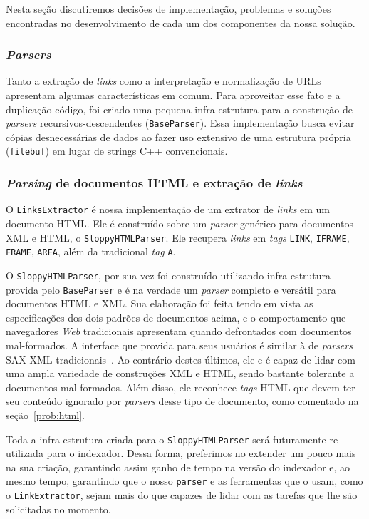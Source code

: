 \documentclass[10pt,twocolumn]{article}
\begin{document}
Nesta seção discutiremos decisões de implementação, problemas e soluções
encontradas no desenvolvimento de cada um dos componentes da nossa
solução.

\subsubsection{\emph{Parsers}}

Tanto a extração de \emph{links} como a interpretação e normalização de
URLs apresentam algumas características em comum. Para aproveitar esse
fato e a duplicação código, foi criado uma pequena infra-estrutura para
a construção de \emph{parsers} recursivos-descendentes
(\texttt{BaseParser}). Essa implementação busca evitar cópias
desnecessárias de dados ao fazer uso extensivo de uma estrutura própria
(\texttt{filebuf}) em lugar de strings C++ convencionais.

\subsubsection{\emph{Parsing} de documentos HTML e extração de
\emph{links}}

O \texttt{LinksExtractor} é nossa implementação de um extrator de
\emph{links} em um documento HTML. Ele é construído sobre um
\emph{parser} genérico para documentos XML e HTML, o
\texttt{SloppyHTMLParser}. Ele recupera \emph{links} em \emph{tags}
\texttt{LINK}, \texttt{IFRAME}, \texttt{FRAME}, \texttt{AREA}, além da
tradicional \emph{tag} \texttt{A}.

O \texttt{SloppyHTMLParser}, por sua vez foi construído utilizando
infra-estrutura provida pelo \texttt{BaseParser} e é na verdade um
\emph{parser} completo e versátil para documentos HTML e XML. Sua
elaboração foi feita tendo em vista as especificações dos dois padrões
de documentos acima, e o comportamento que navegadores \emph{Web}
tradicionais apresentam quando defrontados com documentos mal-formados.
A interface que provida para seus usuários é similar à de \emph{parsers}
SAX XML tradicionais~\cite{saxxml, bray2006xml, html4tr}. Ao contrário
destes últimos, ele e é capaz de lidar com uma ampla variedade de
construções XML e HTML, sendo bastante tolerante a documentos
mal-formados. Além disso, ele reconhece \emph{tags} HTML que devem ter
seu conteúdo ignorado por \emph{parsers} desse tipo de documento, como
comentado na seção~\ref{prob:html}.

Toda a infra-estrutura criada para o \texttt{SloppyHTMLParser} será
futuramente re-utilizada para o indexador. Dessa forma, preferimos no
extender um pouco mais na sua criação, garantindo assim ganho de tempo
na versão do indexador e, ao mesmo tempo, garantindo que o nosso
\texttt{parser} e as ferramentas que o usam, como o
\texttt{LinkExtractor},  sejam mais do que capazes de lidar com as
tarefas que lhe são solicitadas no momento.
\end{document}
